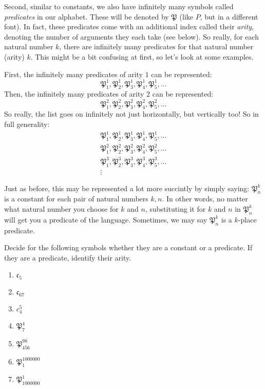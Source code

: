 Second, similar to constants, we also have infinitely many symbols called \textit{predicates} in our alphabet. These will be denoted by $\mathfrak{P}$ (like $P$, but in a different font). In fact, these predicates come with an additional index called their \textit{arity}, denoting the number of arguments they each take (see below). So really, for each natural number $k$, there are infinitely many predicates for that natural number (arity) $k$. This might be a bit confusing at first, so let's look at some examples. 

First, the infinitely many predicates of arity $1$ can be represented:
\[
\mathfrak{P}^1_1, \mathfrak{P}^1_2, \mathfrak{P}^1_3, \mathfrak{P}^1_4, \mathfrak{P}^1_5, ...
\]
Then, the infinitely many predicates of arity $2$ can be represented: 
\[
\mathfrak{P}^2_1, \mathfrak{P}^2_2, \mathfrak{P}^2_3, \mathfrak{P}^2_4, \mathfrak{P}^2_5, ...
\]
So really, the list goes on infinitely not just horizontally, but vertically too! So in full generality: 
\begin{gather*}
\mathfrak{P}^1_1, \mathfrak{P}^1_2, \mathfrak{P}^1_3, \mathfrak{P}^1_4, \mathfrak{P}^1_5, ...\\
\mathfrak{P}^2_1, \mathfrak{P}^2_2, \mathfrak{P}^2_3, \mathfrak{P}^2_4, \mathfrak{P}^2_5, ...\\
\mathfrak{P}^3_1, \mathfrak{P}^3_2, \mathfrak{P}^3_3, \mathfrak{P}^3_4, \mathfrak{P}^3_5, ...\\
\vdots
\end{gather*}

Just as before, this may be represented a lot more succintly by simply saying: $\mathfrak{P}^k_n$ is a constant for each pair of natural numbers $k, n$. In other words, no matter what natural number you choose for $k$ and $n$, substituting it for $k$ and $n$ in $\mathfrak{P}^k_n$ will get you a predicate of the language. Sometimes, we may say $\mathfrak{P}^k_n$ is a $k$-place predicate. 


\begin{exc}
Decide for the following symbols whether they are a constant or a predicate. If they are a predicate, identify their arity. 

\begin{enumerate}
	\item $\mathfrak{c}_5$
	\item $\mathfrak{c}_{67}$
	\item $c^5_4$
	\item $\mathfrak{P}^4_7$
	\item $\mathfrak{P}^{98}_{456}$
	\item $\mathfrak{P}^{1000000}_1$
	\item $\mathfrak{P}_{1000000}^1$
\end{enumerate}
\end{exc}

